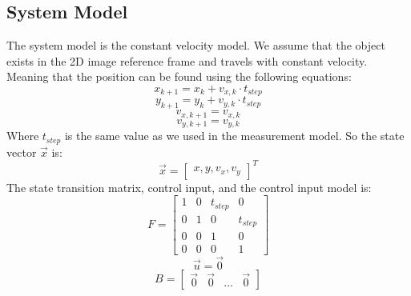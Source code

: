 \documentclass{article} %
\begin{document}
\subsection{System Model}
The system model is the constant velocity model. We assume that the object exists in the 2D image reference frame and travels with constant velocity. Meaning that the position can be found using the following equations:
\begin{equation}
x_{k+1} = x_{k} + v_{x,k} \cdot t_{step}
\end{equation}
\begin{equation}
y_{k+1} = y_{k} + v_{y,k} \cdot t_{step}
\end{equation}
\begin{equation}
v_{x, k+1} = v_{x, k}
\end{equation}
\begin{equation}
v_{y, k+1} = v_{y, k}
\end{equation}
Where $t_{step}$ is the same value as we used in the measurement model. So the state vector $\vec{x}$ is:
\[ \vec{x} = 
\begin{bmatrix}
 x, y, v_x, v_y
\end{bmatrix}^T
\]
The state transition matrix, control input, and the control input model is:
\begin{equation}
F = 
\begin{bmatrix}
1 & 0 & t_{step} & 0 \\
0 & 1 & 0 & t_{step} \\
0 & 0 & 1 & 0 \\
0 & 0 & 0 & 1 
\end{bmatrix}
\end{equation}
\begin{equation}
\vec{u} = \vec{0}
\end{equation}
\begin{equation} 
B = 
\begin{bmatrix}
\vec{0} & \vec{0} & ... & \vec{0}
\end{bmatrix}
\end{equation}
\end{document}
